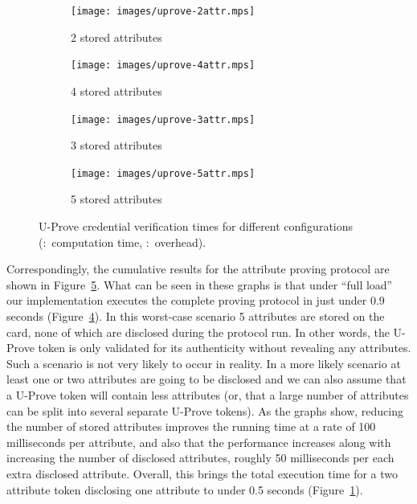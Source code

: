 \begin{figure}[hbt]
  \centering
  \begin{subfigure}[b]{0.4\textwidth}
    \texttt{[image: images/uprove-2attr.mps]}
    \caption{2 stored attributes}
    \label{fig:2attr}
  \end{subfigure}
  \begin{subfigure}[b]{0.5\textwidth}
    \texttt{[image: images/uprove-4attr.mps]}
    \caption{4 stored attributes}
    \label{fig:4attr}
  \end{subfigure}

  \vspace{5mm}

  \begin{subfigure}[b]{0.4\textwidth}
    \texttt{[image: images/uprove-3attr.mps]}
    \caption{3 stored attributes}
    \label{fig:3attr}
  \end{subfigure}
  \begin{subfigure}[b]{0.5\textwidth}
    \texttt{[image: images/uprove-5attr.mps]}
    \caption{5 stored attributes}
    \label{fig:5attr}
  \end{subfigure}

  \caption[U-Prove credential verification times for different configurations.]{
    U-Prove credential verification times for different configurations
    (:~computation time,
      :~overhead).}
  \label{fig:total}
\end{figure}

Correspondingly, the cumulative results for the attribute proving protocol are
shown in Figure~\ref{fig:total}. What can be seen in these graphs is that under
``full load'' our implementation executes the complete proving protocol in just
under 0.9 seconds (Figure~\ref{fig:5attr}). In this worst-case scenario 5
attributes are stored on the card, none of which are disclosed during the
protocol run. In other words, the U-Prove token is only validated for its
authenticity without revealing any attributes. Such a scenario is not very
likely to occur in reality. In a more likely scenario at least one or two
attributes are going to be disclosed and we can also assume that a U-Prove token
will contain less attributes (or, that a large number of attributes can be split
into several separate U-Prove tokens). As the graphs show, reducing the number
of stored attributes improves the running time at a rate of 100 milliseconds per
attribute, and also that the performance increases along with increasing the
number of disclosed attributes, roughly 50 milliseconds per each extra disclosed
attribute. Overall, this brings the total execution time for a two attribute
token disclosing one attribute to under 0.5 seconds (Figure~\ref{fig:2attr}).

